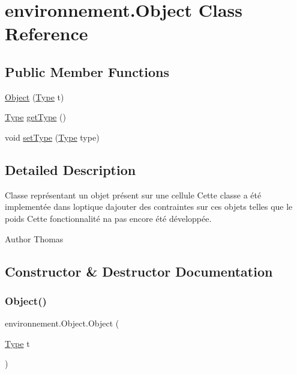 \hypertarget{classenvironnement_1_1_object}{}\section{environnement.\+Object Class Reference}
\label{classenvironnement_1_1_object}
\subsection*{Public Member Functions}
\begin{DoxyCompactItemize}
\item 
\hyperlink{classenvironnement_1_1_object_a1e78f61fea8a24042861aca518768958}{Object} (\hyperlink{enumenvironnement_1_1_type}{Type} t)
\item 
\hyperlink{enumenvironnement_1_1_type}{Type} \hyperlink{classenvironnement_1_1_object_a12c1066fd1d4b8a10d5a982decc2142f}{get\+Type} ()
\item 
void \hyperlink{classenvironnement_1_1_object_aa761d751ee5d7549420d99ffa08ec378}{set\+Type} (\hyperlink{enumenvironnement_1_1_type}{Type} type)
\end{DoxyCompactItemize}


\subsection{Detailed Description}
Classe représentant un objet présent sur une cellule Cette classe a été implementée dans l\textquotesingle{}optique d\textquotesingle{}ajouter des contraintes sur ces objets telles que le poids Cette fonctionnalité n\textquotesingle{}a pas encore été développée. \begin{DoxyAuthor}{Author}
Thomas 
\end{DoxyAuthor}


\subsection{Constructor \& Destructor Documentation}
\hypertarget{classenvironnement_1_1_object_a1e78f61fea8a24042861aca518768958}{}\label{classenvironnement_1_1_object_a1e78f61fea8a24042861aca518768958} 
\subsubsection{\texorpdfstring{Object()}{Object()}}
{\footnotesize\ttfamily environnement.\+Object.\+Object (\begin{DoxyParamCaption}\item[{\hyperlink{enumenvironnement_1_1_type}{Type}}]{t }\end{DoxyParamCaption})}

